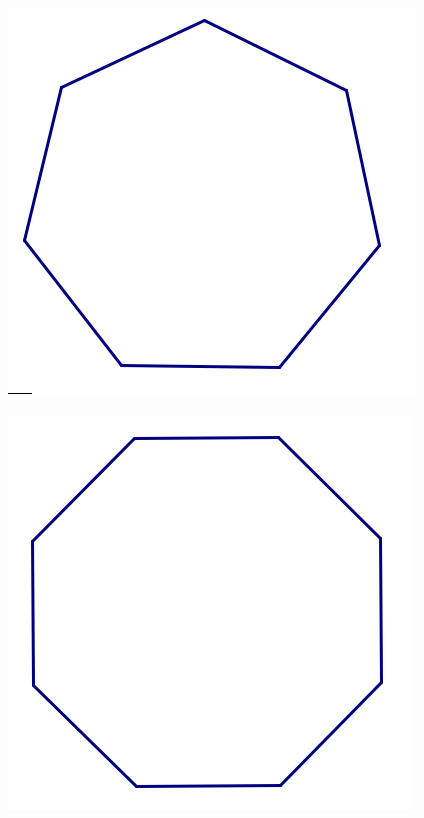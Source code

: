\documentclass[12pt, reqno]{amsart}
\theoremstyle{remark}
\theoremstyle{definition}
\numberwithin{equation}{section}  %
\begin{document}
\begin{center}
\includegraphics[scale = .75]{heptagon}

\includegraphics[scale = .75]{octagon}

\end{center}
\end{document}
